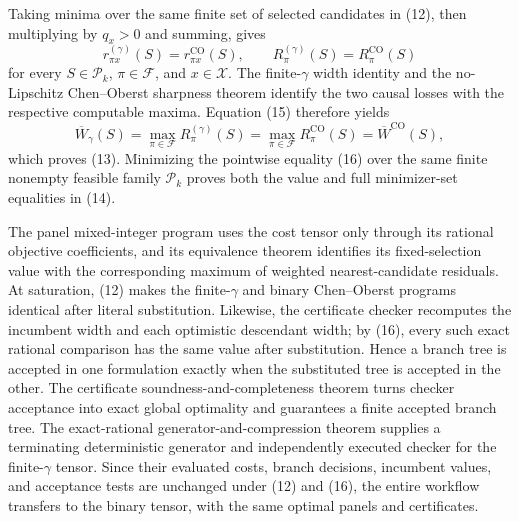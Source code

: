 Taking minima over the same finite set of selected candidates in (12),
then multiplying by \(q_x>0\) and summing, gives
\[
r^{(\gamma)}_{\pi x}(S)=r^{\mathrm{CO}}_{\pi x}(S),
\qquad
R^{(\gamma)}_\pi(S)=R^{\mathrm{CO}}_\pi(S)                           \tag{15}
\]
for every \(S\in\mathcal P_k\), \(\pi\in\mathcal F\), and
\(x\in\mathcal X\).  The finite-\(\gamma\) width identity and the
no-Lipschitz Chen--Oberst sharpness theorem identify the two causal losses
with the respective computable maxima.  Equation (15) therefore yields
\[
\overline W_\gamma(S)
=\max_{\pi\in\mathcal F}R^{(\gamma)}_\pi(S)
=\max_{\pi\in\mathcal F}R^{\mathrm{CO}}_\pi(S)
=\overline W^{\mathrm{CO}}(S),                                      \tag{16}
\]
which proves (13).  Minimizing the pointwise equality (16) over the same
finite nonempty feasible family \(\mathcal P_k\) proves both the value and
full minimizer-set equalities in (14).

The panel mixed-integer program uses the cost tensor only through its
rational objective coefficients, and its equivalence theorem identifies
its fixed-selection value with the corresponding maximum of weighted
nearest-candidate residuals.  At saturation, (12) makes the
finite-\(\gamma\) and binary Chen--Oberst programs identical after literal
substitution.  Likewise, the certificate checker recomputes the incumbent
width and each optimistic descendant width; by (16), every such exact
rational comparison has the same value after substitution.  Hence a branch
tree is accepted in one formulation exactly when the substituted tree is
accepted in the other.  The certificate soundness-and-completeness theorem
turns checker acceptance into exact global optimality and guarantees a
finite accepted branch tree.  The exact-rational
generator-and-compression theorem supplies a terminating deterministic
generator and independently executed checker for the finite-\(\gamma\)
tensor.  Since their evaluated costs, branch decisions, incumbent values,
and acceptance tests are unchanged under (12) and (16), the entire
workflow transfers to the binary tensor, with the same optimal panels and
certificates.

